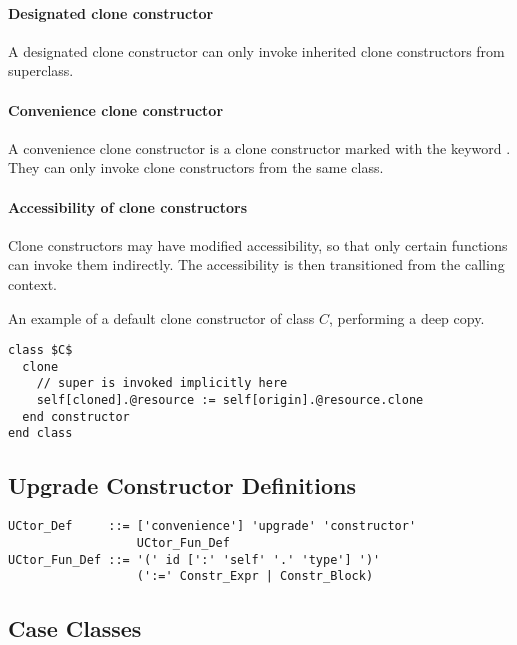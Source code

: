 \paragraph{Designated clone constructor}
A designated clone constructor can only invoke inherited clone constructors from superclass. 

\paragraph{Convenience clone constructor}
A convenience clone constructor is a clone constructor marked with the keyword . They can only invoke clone constructors from the same class. 

\paragraph{Accessibility of clone constructors}
Clone constructors may have modified accessibility, so that only certain functions can invoke them indirectly. The accessibility is then transitioned from the calling context. 

\example An example of a default clone constructor of class $C$, performing a deep copy. 
\begin{lstlisting}
class $C$
  clone
    // super is invoked implicitly here
    self[cloned].@resource := self[origin].@resource.clone
  end constructor
end class
\end{lstlisting}





\subsection{Upgrade Constructor Definitions}
\label{sec:upgrade-def}

\syntax\begin{lstlisting}
UCtor_Def     ::= ['convenience'] 'upgrade' 'constructor' 
                  UCtor_Fun_Def
UCtor_Fun_Def ::= '(' id [':' 'self' '.' 'type'] ')'
                  (':=' Constr_Expr | Constr_Block)
\end{lstlisting}







\subsection{Case Classes}
\label{sec:case-classes}

